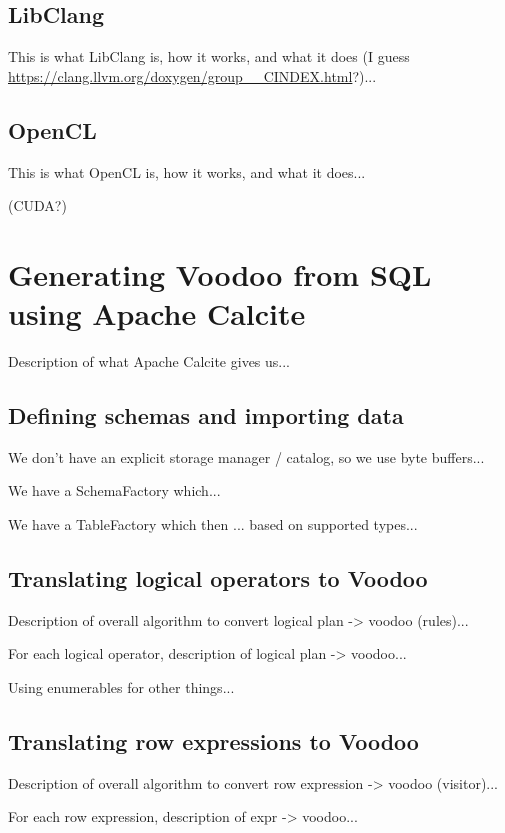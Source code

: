 \subsection{LibClang}

This is what LibClang is, how it works, and what it does (I guess \url{https://clang.llvm.org/doxygen/group__CINDEX.html}?)...

\subsection{OpenCL}

This is what OpenCL is, how it works, and what it does...

(CUDA?)

\section{Generating Voodoo from SQL using Apache Calcite}

Description of what Apache Calcite gives us...

\subsection{Defining schemas and importing data}

We don't have an explicit storage manager / catalog, so we use byte buffers...

We have a SchemaFactory which...

We have a TableFactory which then ... based on supported types...

\subsection{Translating logical operators to Voodoo}

Description of overall algorithm to convert logical plan -> voodoo (rules)...

For each logical operator, description of logical plan -> voodoo...

Using enumerables for other things...

\subsection{Translating row expressions to Voodoo}

Description of overall algorithm to convert row expression -> voodoo (visitor)...

For each row expression, description of expr -> voodoo...

